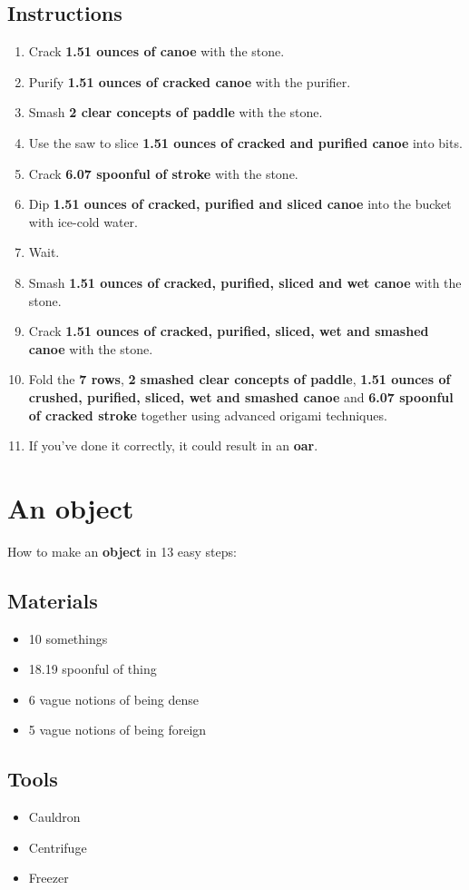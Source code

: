 \documentclass{article}
\begin{document}
\subsection{Instructions}\begin{enumerate}
\item 
Crack \textbf{1.51 ounces of canoe} with the stone.
\item 
Purify \textbf{1.51 ounces of cracked canoe} with the purifier.
\item 
Smash \textbf{2 clear concepts of paddle} with the stone.
\item 
Use the saw to slice \textbf{1.51 ounces of cracked and purified canoe} into bits.
\item 
Crack \textbf{6.07 spoonful of stroke} with the stone.
\item 
Dip \textbf{1.51 ounces of cracked, purified and sliced canoe} into the bucket with ice-cold water.
\item 
Wait.
\item 
Smash \textbf{1.51 ounces of cracked, purified, sliced and wet canoe} with the stone.
\item 
Crack \textbf{1.51 ounces of cracked, purified, sliced, wet and smashed canoe} with the stone.
\item 
Fold the \textbf{7 rows}, \textbf{2 smashed clear concepts of paddle}, \textbf{1.51 ounces of crushed, purified, sliced, wet and smashed canoe} and \textbf{6.07 spoonful of cracked stroke} together using advanced origami techniques.
\item 
If you've done it correctly, it could result in an \textbf{oar}.
\end{enumerate}
\newpage
\section{An object}How to make an \textbf{object} in 13 easy steps:

\subsection{Materials}\begin{itemize}
\item 
10 somethings
\item 
18.19 spoonful of thing
\item 
6 vague notions of being dense
\item 
5 vague notions of being foreign
\end{itemize}
\subsection{Tools}\begin{itemize}
\item 
Cauldron
\item 
Centrifuge
\item 
Freezer
\end{itemize}
\end{document}
